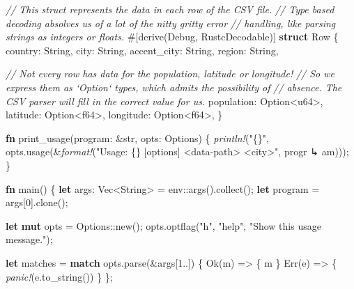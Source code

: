 \documentclass[a4paper,]{book}
\newenvironment{Shaded}{\begin{snugshade}}{\end{snugshade}}
\newcommand{\KeywordTok}[1]{\textcolor[rgb]{0.13,0.29,0.53}{\textbf{{#1}}}}
\newcommand{\DataTypeTok}[1]{\textcolor[rgb]{0.13,0.29,0.53}{{#1}}}
\newcommand{\DecValTok}[1]{\textcolor[rgb]{0.00,0.00,0.81}{{#1}}}
\newcommand{\ConstantTok}[1]{\textcolor[rgb]{0.00,0.00,0.00}{{#1}}}
\newcommand{\StringTok}[1]{\textcolor[rgb]{0.31,0.60,0.02}{{#1}}}
\newcommand{\CommentTok}[1]{\textcolor[rgb]{0.56,0.35,0.01}{\textit{{#1}}}}
\newcommand{\BuiltInTok}[1]{{#1}}
\newcommand{\PreprocessorTok}[1]{\textcolor[rgb]{0.56,0.35,0.01}{\textit{{#1}}}}
\newcommand{\AttributeTok}[1]{\textcolor[rgb]{0.77,0.63,0.00}{{#1}}}
\newcommand{\NormalTok}[1]{{#1}}
\begin{document}
\begin{Shaded}
\begin{Highlighting}[]
\CommentTok{// This struct represents the data in each row of the CSV file.}
\CommentTok{// Type based decoding absolves us of a lot of the nitty gritty error}
\CommentTok{// handling, like parsing strings as integers or floats.}
\AttributeTok{#[}\NormalTok{derive}\AttributeTok{(}\BuiltInTok{Debug}\AttributeTok{,} \NormalTok{RustcDecodable}\AttributeTok{)]}
\KeywordTok{struct} \NormalTok{Row \{}
    \NormalTok{country: }\DataTypeTok{String}\NormalTok{,}
    \NormalTok{city: }\DataTypeTok{String}\NormalTok{,}
    \NormalTok{accent_city: }\DataTypeTok{String}\NormalTok{,}
    \NormalTok{region: }\DataTypeTok{String}\NormalTok{,}

    \CommentTok{// Not every row has data for the population, latitude or longitude!}
    \CommentTok{// So we express them as `Option` types, which admits the possibility of}
    \CommentTok{// absence. The CSV parser will fill in the correct value for us.}
    \NormalTok{population: }\DataTypeTok{Option}\NormalTok{<}\DataTypeTok{u64}\NormalTok{>,}
    \NormalTok{latitude: }\DataTypeTok{Option}\NormalTok{<}\DataTypeTok{f64}\NormalTok{>,}
    \NormalTok{longitude: }\DataTypeTok{Option}\NormalTok{<}\DataTypeTok{f64}\NormalTok{>,}
\NormalTok{\}}

\KeywordTok{fn} \NormalTok{print_usage(program: &}\DataTypeTok{str}\NormalTok{, opts: Options) \{}
    \PreprocessorTok{println!}\NormalTok{(}\StringTok{"\{\}"}\NormalTok{, opts.usage(&}\PreprocessorTok{format!}\NormalTok{(}\StringTok{"Usage: \{\} [options] <data-path> <city>"}\NormalTok{, progr}
\NormalTok{↳ am)));}
\NormalTok{\}}

\KeywordTok{fn} \NormalTok{main() \{}
    \KeywordTok{let} \NormalTok{args: }\DataTypeTok{Vec}\NormalTok{<}\DataTypeTok{String}\NormalTok{> = env::args().collect();}
    \KeywordTok{let} \NormalTok{program = args[}\DecValTok{0}\NormalTok{].clone();}

    \KeywordTok{let} \KeywordTok{mut} \NormalTok{opts = Options::new();}
    \NormalTok{opts.optflag(}\StringTok{"h"}\NormalTok{, }\StringTok{"help"}\NormalTok{, }\StringTok{"Show this usage message."}\NormalTok{);}
    
    \KeywordTok{let} \NormalTok{matches = }\KeywordTok{match} \NormalTok{opts.parse(&args[}\DecValTok{1.}\NormalTok{.]) \{}
        \ConstantTok{Ok}\NormalTok{(m)  => \{ m \}}
        \ConstantTok{Err}\NormalTok{(e) => \{ }\PreprocessorTok{panic!}\NormalTok{(e.to_string()) \}}
    \NormalTok{\};}
    

\end{Highlighting}
\end{Shaded}
\end{document}
